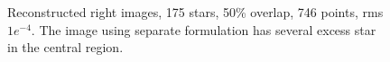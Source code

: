 \begin{enumerate}
\begin{figure}[t!]
\hspace{-0.5in}
\hspace{-1in}
\caption [Reconstructed right images, 175 stars, 50\% overlap, 746 points,  rms $1e^{-4}$]{Reconstructed right images, 175 stars, 50\% overlap, 746 points, rms $1e^{-4}$. The image using separate formulation has several excess star in the central region.}
\label{fig:expt16}
\end{figure}
\end{enumerate}
